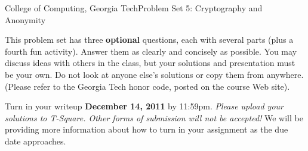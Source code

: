 \documentclass[11pt]{article}
\begin{document}


{College of Computing, Georgia Tech}{Problem Set 5: Cryptography and Anonymity}

This problem set has three {\bf optional} questions, each with several
parts (plus a fourth fun activity).  Answer them as clearly and
concisely as possible.  You may discuss ideas with others in the class,
but your solutions and presentation must be your own.  Do not look at
anyone else's solutions or copy them from anywhere. (Please refer to the
Georgia Tech honor code, posted on the course Web site).

Turn in your writeup {\bf December 14, 2011} by 11:59pm.
{\em Please upload your solutions to T-Square.  Other forms of
  submission will not be accepted!}  We will be providing more
information about how to turn in your assignment as the due date
approaches.
\end{document}
